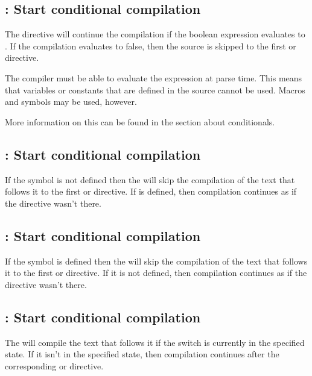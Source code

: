 \subsection{ : Start conditional compilation}

The directive  will continue the compilation
if the boolean expression  evaluates to . If the
compilation evaluates to false, then the source is skipped to the first
 or  directive.

The compiler must be able to evaluate the expression at parse time.
This means that variables or constants that are defined in
the source cannot be used. Macros and symbols may be used, however.

More information on this can be found in the section about
conditionals.

\subsection{ : Start conditional compilation}

If the symbol  is not defined then the 
will skip the compilation of the text that follows it to the first
 or  directive.
If  is defined, then compilation continues as if the directive
wasn't there.

\subsection{ : Start conditional compilation}

If the symbol  is defined then the 
will skip the compilation of the text that follows it to the first
 or  directive.
If it is not defined, then compilation continues as if the directive
wasn't there.

\subsection{ : Start conditional compilation}

The  will compile the text that follows it if the
switch  is currently in the specified state.
If it isn't in the specified state, then compilation continues after the
corresponding  or  directive.

